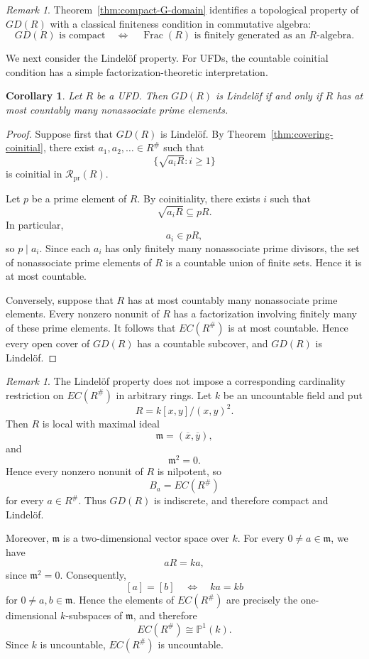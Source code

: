 \documentclass[11pt]{amsart}
\theoremstyle{plain}
\newtheorem{corollary}[theorem]{Corollary}
\theoremstyle{definition}
\theoremstyle{remark}
\newtheorem{remark}[theorem]{Remark}
\numberwithin{equation}{section}
\begin{document}
\begin{remark}
	Theorem~\ref{thm:compact-G-domain} identifies a topological property of
	$GD(R)$ with a classical finiteness condition in commutative algebra:
	\[
	GD(R)\text{ is compact}
	\quad\Longleftrightarrow\quad
	\operatorname{Frac}(R)\text{ is finitely generated as an }R\text{-algebra}.
	\]
\end{remark}


We next consider the Lindel\"of property. For UFDs, the countable
coinitial condition has a simple factorization-theoretic interpretation.

\begin{corollary}\label{cor:UFD-Lindelof}
	Let $R$ be a UFD. Then $GD(R)$ is Lindel\"of if and only if $R$ has
	at most countably many nonassociate prime elements.
\end{corollary}

\begin{proof}
	Suppose first that $GD(R)$ is Lindel\"of. By
	Theorem~\ref{thm:covering-coinitial}, there exist
	$a_1,a_2,\ldots\in R^\#$ such that
	\[
	\{\sqrt{a_iR}:i\geq1\}
	\]
	is coinitial in $\mathcal R_{\mathrm{pr}}(R)$.
	
	Let $p$ be a prime element of $R$. By coinitiality, there exists $i$
	such that
	\[
	\sqrt{a_iR}\subseteq pR.
	\]
	In particular,
	\[
	a_i\in pR,
	\]
	so $p\mid a_i$. Since each $a_i$ has only finitely many nonassociate
	prime divisors, the set of nonassociate prime elements of $R$ is a
	countable union of finite sets. Hence it is at most countable.
	
	Conversely, suppose that $R$ has at most countably many nonassociate
	prime elements. Every nonzero nonunit of $R$ has a factorization
	involving finitely many of these prime elements. It follows that
	$EC(R^\#)$ is at most countable. Hence every open cover of $GD(R)$
	has a countable subcover, and $GD(R)$ is Lindel\"of.
\end{proof}

\begin{remark}\label{rem:Lindelof-cardinality}
	The Lindel\"of property does not impose a corresponding cardinality
	restriction on $EC(R^\#)$ in arbitrary rings. Let $k$ be an
	uncountable field and put
	\[
	R=k[x,y]/(x,y)^2.
	\]
	Then $R$ is local with maximal ideal
	\[
	\mathfrak m=(\overline{x},\overline{y}),
	\]
	and
	\[
	\mathfrak m^2=0.
	\]
	Hence every nonzero nonunit of $R$ is nilpotent, so
	\[
	B_a=EC(R^\#)
	\]
	for every $a\in R^\#$. Thus $GD(R)$ is indiscrete, and therefore
	compact and Lindel\"of.
	
	Moreover, $\mathfrak m$ is a two-dimensional vector space over $k$.
	For every $0\neq a\in\mathfrak m$, we have
	\[
	aR=ka,
	\]
	since $\mathfrak m^2=0$. Consequently,
	\[
	[a]=[b]
	\quad\Longleftrightarrow\quad
	ka=kb
	\]
	for $0\neq a,b\in\mathfrak m$. Hence the elements of $EC(R^\#)$ are
	precisely the one-dimensional $k$-subspaces of $\mathfrak m$, and
	therefore
	\[
	EC(R^\#)\cong\mathbb P^1(k).
	\]
	Since $k$ is uncountable, $EC(R^\#)$ is uncountable.
\end{remark}
\end{document}
